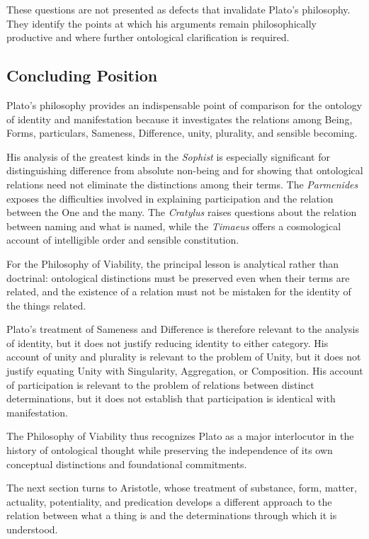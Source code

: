 These questions are not presented as defects that invalidate
Plato's philosophy. They identify the points at which his
arguments remain philosophically productive and where further
ontological clarification is required.

\subsection{Concluding Position}

Plato's philosophy provides an indispensable point of comparison
for the ontology of identity and manifestation because it
investigates the relations among Being, Forms, particulars,
Sameness, Difference, unity, plurality, and sensible becoming.

His analysis of the greatest kinds in the \textit{Sophist} is
especially significant for distinguishing difference from
absolute non-being and for showing that ontological relations
need not eliminate the distinctions among their terms. The
\textit{Parmenides} exposes the difficulties involved in
explaining participation and the relation between the One
and the many. The \textit{Cratylus} raises questions about
the relation between naming and what is named, while the
\textit{Timaeus} offers a cosmological account of intelligible
order and sensible constitution.

For the Philosophy of Viability, the principal lesson is
analytical rather than doctrinal: ontological distinctions
must be preserved even when their terms are related, and
the existence of a relation must not be mistaken for the
identity of the things related.

Plato's treatment of Sameness and Difference is therefore
relevant to the analysis of identity, but it does not justify
reducing identity to either category. His account of unity
and plurality is relevant to the problem of Unity, but it
does not justify equating Unity with Singularity, Aggregation,
or Composition. His account of participation is relevant
to the problem of relations between distinct determinations,
but it does not establish that participation is identical
with manifestation.

The Philosophy of Viability thus recognizes Plato as a
major interlocutor in the history of ontological thought
while preserving the independence of its own conceptual
distinctions and foundational commitments.

The next section turns to Aristotle, whose treatment of
substance, form, matter, actuality, potentiality, and
predication develops a different approach to the relation
between what a thing is and the determinations through
which it is understood.

